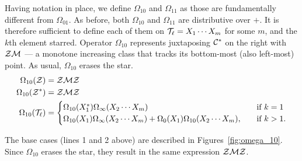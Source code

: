 \documentclass[12pt, a4paper, twoside]{report}
\begin{document}
Having notation in place, we define $\Omega_{10}$ and $\Omega_{11}$ as those are fundamentally different from $\Omega_{01}$. As before, both $\Omega_{10}$ and $\Omega_{11}$ are distributive over $+$. It is therefore sufficient to define each of them on $\mathcal{T}_\ell = X_1\cdots X_m$ for some $m$, and the $k$th element starred. Operator $\Omega_{10}$ represents juxtaposing $\mathcal{C}^*$ on the right with $\mathcal{Z}\mathcal{M}$ --- a monotone increasing class that tracks its bottom-most (also left-most) point. As usual, $\Omega_{10}$ erases the star.
\begin{align*}
  \Omega_{10}(\mathcal{Z}) &= \mathcal{Z}\mathcal{M}\mathcal{Z}\\
  \Omega_{10}(\mathcal{Z}^*) &= \mathcal{Z}\mathcal{M}\mathcal{Z}\\
  \Omega_{10}(\mathcal{T}_\ell) &=
                      \begin{cases}
                        \Omega_{10}(X_1^*)\Omega_\infty(X_2\cdots X_m) \quad &\text{if $k = 1$}\\
                        \Omega_{10}(X_1)\Omega_\infty(X_2\cdots X_m) + \Omega_0(X_1)\Omega_{10}(X_2\cdots X_m),\quad &\text{if $k>1$.}
                      \end{cases}
\end{align*}

The base cases (lines 1 and 2 above) are described in Figures~\ref{fig:omega_10}. Since $\Omega_{10}$ erases the star, they result in the same expression $\mathcal{Z}\mathcal{M}\mathcal{Z}$.
\end{document}
